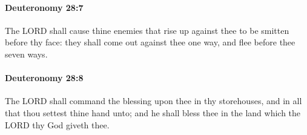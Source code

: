 		\paragraph{Deuteronomy 28:7} %
			\label{DEUTERONOMY-28-7}

			The LORD shall cause thine enemies that rise up against thee to be smitten before thy face: they shall come out against thee one way, and flee before thee seven ways.


		\paragraph{Deuteronomy 28:8} %
			\label{DEUTERONOMY-28-8}

			The LORD shall command the blessing upon thee in thy storehouses, and in all that thou settest thine hand unto; and he shall bless thee in the land which the LORD thy God giveth thee.

